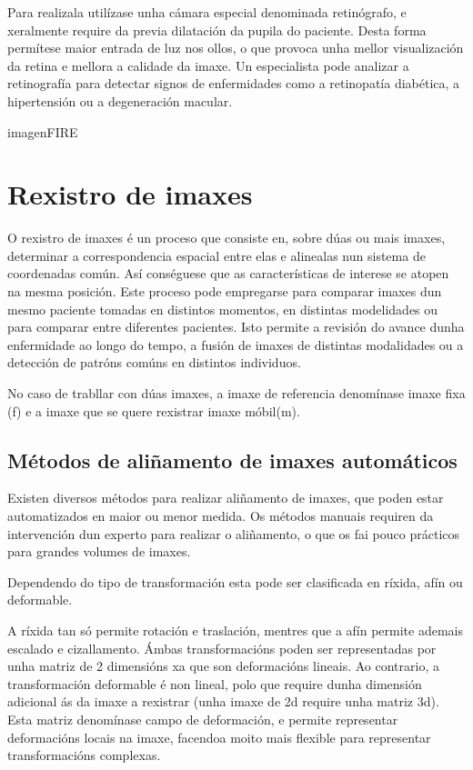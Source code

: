 Para realizala utilízase unha cámara especial denominada retinógrafo, e xeralmente require da previa dilatación da pupila do paciente.
Desta forma permítese maior entrada de luz nos ollos, o que provoca unha mellor visualización da retina e mellora a calidade da imaxe.
Un especialista pode analizar a retinografía para detectar signos de enfermidades como a retinopatía diabética, a hipertensión ou a degeneración macular.

imagenFIRE

\section{Rexistro de imaxes}
\label{sec:Rexistro de imaxes}
O rexistro de imaxes é un proceso que consiste en, sobre dúas ou mais imaxes, determinar a correspondencia espacial entre elas e alinealas nun sistema de coordenadas común.
Así conséguese que as características de interese se atopen na mesma posición.
Este proceso pode empregarse para comparar imaxes dun mesmo paciente tomadas en distintos momentos, en distintas modelidades ou para comparar entre diferentes pacientes.
Isto permite a revisión do avance dunha enfermidade ao longo do tempo, a fusión de imaxes de distintas modalidades ou a detección de patróns comúns en distintos individuos.

No caso de trabllar con dúas imaxes, a imaxe de referencia denomínase imaxe fixa (f) e a imaxe que se quere rexistrar imaxe móbil(m).

\subsection{Métodos de aliñamento de imaxes automáticos}
\label{subsec:Métodos de aliñamento de imaxes automáticos}
Existen diversos métodos para realizar aliñamento de imaxes, que poden estar automatizados en maior ou menor medida.
Os métodos manuais requiren da intervención dun experto para realizar o aliñamento, o que os fai pouco prácticos para grandes volumes de imaxes.

Dependendo do tipo de transformación esta pode ser clasificada en ríxida, afín ou deformable.

A ríxida tan só permite rotación e traslación, mentres que a afín permite ademais escalado e cizallamento.
Ámbas transformacións poden ser representadas por unha matriz de 2 dimensións xa que son deformacións lineais.
Ao contrario, a transformación deformable é non lineal, polo que require dunha dimensión adicional ás da imaxe a rexistrar (unha imaxe de 2d require unha matriz 3d).
Esta matriz denomínase campo de deformación, e permite representar deformacións locais na imaxe, facendoa moito mais flexible para representar transformacións complexas.

